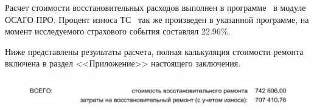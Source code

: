 %
\vspace{5mm}
\renewcommand\baselinestretch{1}\small\normalsize
%
%
%
\renewcommand\baselinestretch{1.2}\small\normalsize
Расчет стоимости восстановительных расходов выполнен в программе \auda\, в модуле ОСАГО ПРО. Процент износа ТС \, так же произведен в указанной программе, на момент  исследуемого страхового события составлял 22.96\%. \par Ниже представлены результаты расчета, полная калькуляция стоимости ремонта включена в раздел <<Приложение>> настоящего заключения.
\begin{figure}[H]
	\centering
	\includegraphics[width=0.8\linewidth]{images/Screenshot_2}
\end{figure}
